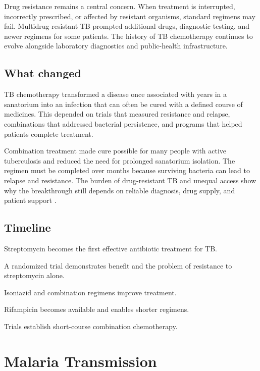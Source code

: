 \documentclass[12pt,oneside]{book}
\begin{document}
Drug resistance remains a central concern. When treatment is interrupted,
incorrectly prescribed, or affected by resistant organisms, standard regimens
may fail. Multidrug-resistant TB prompted additional drugs, diagnostic
testing, and newer regimens for some patients. The history of TB chemotherapy
continues to evolve alongside laboratory diagnostics and public-health
infrastructure.

\section{What changed}
TB chemotherapy transformed a disease once associated with years in a sanatorium into an infection that can often be cured with a defined course of medicines. This depended on trials that measured resistance and relapse, combinations that addressed bacterial persistence, and programs that helped patients complete treatment.

Combination treatment made cure possible for many people with active
tuberculosis and reduced the need for prolonged sanatorium isolation. The
regimen must be completed over months because surviving bacteria can lead to
relapse and resistance. The burden of drug-resistant TB and unequal access
show why the breakthrough still depends on reliable diagnosis, drug supply,
and patient support \cite{tbChemotherapyReview,tbTreatmentHistory}.

\section*{Timeline}
\begin{description}[leftmargin=2.3cm,style=nextline]
  \item[1940s] Streptomycin becomes the first effective antibiotic treatment for TB.
  \item[1948] A randomized trial demonstrates benefit and the problem of resistance to streptomycin alone.
  \item[1950s] Isoniazid and combination regimens improve treatment.
  \item[1960s] Rifampicin becomes available and enables shorter regimens.
  \item[1970s--1980s] Trials establish short-course combination chemotherapy.
\end{description}
\chapter[Malaria Transmission]{Malaria Transmission}
\end{document}
